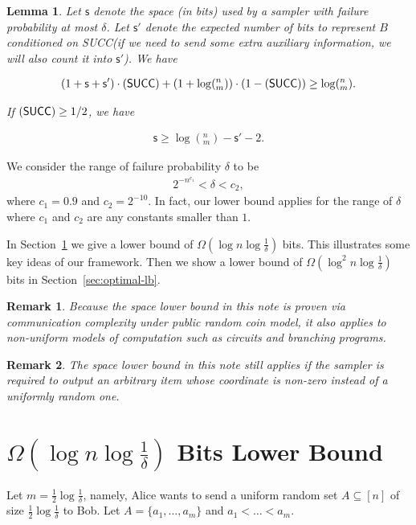 \documentclass[10pt]{article}
\newtheorem{lemma}{Lemma}
\newtheorem{remark}{Remark}
\let\Pr\relax
\DeclareMathOperator*{\Pr}{\mathbb{P}}
\newcommand{\success}{\textsf{SUCC}\xspace}
\newcommand{\s}{\textsf{s}\xspace}
\begin{document}
\begin{lemma} \label{lemma:lb-meta}
  Let $\s$ denote the space (in bits) used by a sampler with failure probability at most $\delta$. Let $\s'$ denote the expected number of bits to represent $B$ conditioned on \success (if we need to send some extra auxiliary information, we will also count it into $\s'$). We have 
  
  \begin{align}
  (1+\s+\s')\cdot \Pr(\success)+(1+\log (^n_m)) \cdot (1-\Pr(\success)) \ge \log (^n_m).
  \end{align} 
  
  If $\Pr(\success)\ge 1/2$, we have 
  
  \begin{align} \label{formula:lb-meta}
  \s\ge \log (^n_m) - \s' - 2.
  \end{align} 
\end{lemma}

We consider the range of failure probability $\delta$ to be 
\begin{align} \label{formula:delta-range}
2^{-n^{c_1}}<\delta<c_2,
\end{align}
where $c_1=0.9$ and $c_2=2^{-10}$. In fact, our lower bound applies for the range of $\delta$ where $c_1$ and $c_2$ are any constants smaller than $1$. 

In Section~\ref{sec:simple-lb} we give a lower bound of $\Omega(\log n \log \frac{1}{\delta})$ bits. This illustrates some key ideas of our framework. Then we show a lower bound of $\Omega(\log^2 n \log \frac{1}{\delta})$ bits in Section~\ref{sec:optimal-lb}.

\begin{remark}
  Because the space lower bound in this note is proven via communication complexity under public random coin model, it also applies to non-uniform models of computation such as circuits and branching programs.  
\end{remark}

\begin{remark}
  The space lower bound in this note still applies if the sampler is required to output an arbitrary item whose coordinate is non-zero instead of a uniformly random one. 
\end{remark}

\section{$\Omega(\log n \log {\frac{1}{\delta}})$ Bits Lower Bound}\label{sec:simple-lb}
Let $m=\frac{1}{2}\log \frac{1}{\delta}$, namely, Alice wants to send a uniform random set $A\subseteq [n]$ of size $\frac{1}{2}\log\frac{1}{\delta}$ to Bob. Let $A=\{a_1,\ldots,a_m\}$ and $a_1<\ldots<a_m$. 
\end{document}
